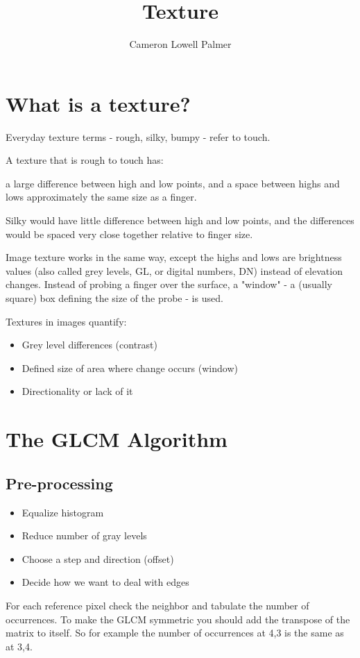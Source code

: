 \documentclass[a4paper,11pt]{article}
\title{Texture}
\author{Cameron Lowell Palmer}
\begin{document}
\maketitle
\section{What is a texture?}

Everyday texture terms - rough, silky, bumpy - refer to touch.

A texture that is rough to touch has:

a large difference between high and low points, and a space between highs and lows approximately the same size as a finger.

Silky would have little difference between high and low points, and the differences would be spaced very close together relative to finger size.

Image texture works in the same way, except the highs and lows are brightness values (also called grey levels, GL,  or digital numbers, DN) instead of elevation changes. Instead of probing a finger over the surface, a "window" - a (usually square) box defining the size of the probe - is used. 
 
Textures in images quantify:
\begin{itemize}
	\item Grey level differences (contrast)
	\item Defined size of area where change occurs (window)
	\item Directionality or lack of it
\end{itemize}

\section{The GLCM Algorithm}

\subsection{Pre-processing}
\begin{itemize}
	\item Equalize histogram
	\item Reduce number of gray levels
	\item Choose a step and direction (offset)
	\item Decide how we want to deal with edges
\end{itemize}

For each reference pixel check the neighbor and tabulate the number of occurrences. To make the GLCM symmetric you should add the transpose of the matrix to itself. So for example the number of occurrences at 4,3 is the same as at 3,4.
\end{document}
